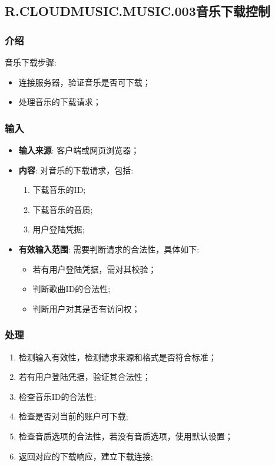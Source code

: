 \subsection{R.CLOUDMUSIC.MUSIC.003音乐下载控制}
\subsubsection{介绍}
	音乐下载步骤:
	\begin{itemize}
		\item 连接服务器，验证音乐是否可下载；
		\item 处理音乐的下载请求；
	\end{itemize}
\subsubsection{输入}
	\begin{itemize}
		\item \textbf{输入来源}: 客户端或网页浏览器；
		\item \textbf{内容}: 对音乐的下载请求，包括: 
		\begin{enumerate}
			\item 下载音乐的ID;
			\item 下载音乐的音质;
			\item 用户登陆凭据;
		\end{enumerate}
		\item \textbf{有效输入范围}: 需要判断请求的合法性，具体如下: 
		\begin{itemize}
			\item 若有用户登陆凭据，需对其校验； 
			\item 判断歌曲ID的合法性;
			\item 判断用户对其是否有访问权；
		\end{itemize}
	\end{itemize}
\subsubsection{处理}
	\begin{enumerate}
		\item 检测输入有效性，检测请求来源和格式是否符合标准；
		\item 若有用户登陆凭据，验证其合法性；
		\item 检查音乐ID的合法性;
		\item 检查是否对当前的账户可下载;
		\item 检查音质选项的合法性，若没有音质选项，使用默认设置；
		\item 返回对应的下载响应，建立下载连接;
	\end{enumerate}
